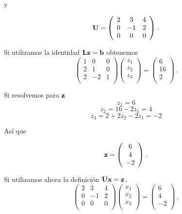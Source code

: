 \documentclass[
]{agujournal2019}
\begin{document}
\noindent y

\[{\textbf U}=\left(\begin{array}{ccccc}
  2 & 3 & 4\\
  0 & -1 & 2\\
  0 & 0 & 0 \\
        \end{array}\right)\,.\]

Si utilizamos la identidad \({\textbf L}{\textbf z}={\textbf b}\)
obtenemos \[\left(\begin{array}{ccccc}
  1 & 0 & 0\\
  2 & 1 & 0\\
  2 & -2 & 1 \\
        \end{array}\right)
    \left(\begin{array}{c}
  z_1 \\
  z_2 \\
  z_3 \\
        \end{array}\right)=
    \left(\begin{array}{c}
  6 \\
  16 \\
  2 \\
        \end{array}\right)\,.\]

Si resolvemos para \({\textbf z}\) \[z_1=6\] \[z_2=16-2z_1=4\]
\[z_3=2+2z_2-2z_1=-2\]

Así que

\[{\textbf z}=\left(\begin{array}{c}
  6 \\
  4 \\
  -2 \\
        \end{array}\right)\,.\]

Si utilizamos ahora la definición
\({\textbf U}{\textbf x}={\textbf z}\,,\) \[\left(\begin{array}{ccccc}
  2 & 3 & 4\\
  0 & -1 & 2\\
  0 & 0 & 0 \\
        \end{array}\right)
    \left(\begin{array}{c}
  x_1 \\
  x_2 \\
  x_3 \\
        \end{array}\right)=
    \left(\begin{array}{c}
  6 \\
  4 \\
  -2 \\
        \end{array}\right)\,,\]
\end{document}

